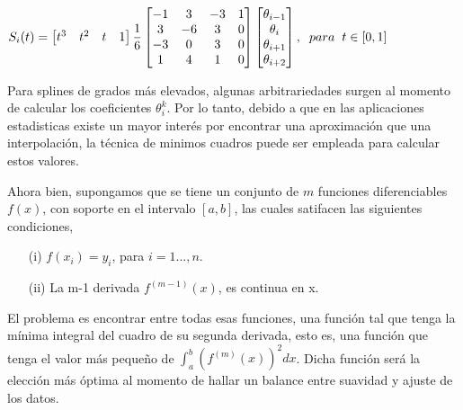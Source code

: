\begin{center}
$\displaystyle{S_{i}(t) = \begin{bmatrix} t^3  & t^2 & t & 1  \end{bmatrix} \frac{1}{6} \begin{bmatrix} -1 & 3 & -3 & 1 \\ 3 & -6 & 3 & 0 \\ -3 & 0 & 3 & 0 \\ 1 & 4 & 1 & 0 \end{bmatrix} \begin{bmatrix}  \theta_{i-1} \\ \theta_{i} \\ \theta_{i+1} \\ \theta_{i+2}  \end{bmatrix} , \hspace{0.2cm} para \hspace{0.2cm} t \in [0,1] }$
\end{center}





\hspace{0.4cm}Para splines de grados m\'as elevados, algunas arbitrariedades surgen al momento de calcular los coeficientes $\theta_{i}^{k}$. Por lo tanto, debido a que en las aplicaciones estadisticas existe un mayor inter\'es por encontrar una aproximaci\'on que una interpolaci\'on, la t\'ecnica de minimos cuadros puede ser empleada para calcular estos valores.


\vspace{0.5cm}

\hspace{0.4cm} Ahora bien, supongamos que se tiene un conjunto de $m$ funciones diferenciables $f(x)$, con soporte en el intervalo $[a,b]$, las cuales satifacen las siguientes condiciones,


\begin{itemize}
  \item[(i)] $f(x_{i})=y_{i}$, para $i=1...,n$.
  \item[(ii)] La m-1 derivada $f^{(m-1)}(x)$, es continua en x.
\end{itemize}

\hspace{0.4cm} El problema es encontrar entre todas esas funciones, una funci\'on tal que tenga la m\'inima integral del cuadro de su segunda derivada, esto es, una funci\'on que tenga el valor m\'as peque\~no de $\int_{a}^{b} (f^{(m)}(x))^2 dx$. Dicha funci\'on ser\'a la elecci\'on m\'as \'optima al momento de hallar un balance entre suavidad y ajuste de los datos.

